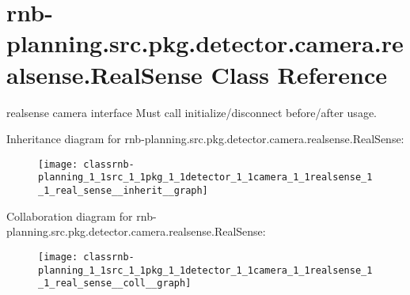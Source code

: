 \hypertarget{classrnb-planning_1_1src_1_1pkg_1_1detector_1_1camera_1_1realsense_1_1_real_sense}{}\section{rnb-\/planning.src.\+pkg.\+detector.\+camera.\+realsense.\+Real\+Sense Class Reference}
\label{classrnb-planning_1_1src_1_1pkg_1_1detector_1_1camera_1_1realsense_1_1_real_sense}


realsense camera interface Must call initialize/disconnect before/after usage.  




Inheritance diagram for rnb-\/planning.src.\+pkg.\+detector.\+camera.\+realsense.\+Real\+Sense\+:
\nopagebreak
\begin{figure}[H]
\begin{center}
\leavevmode
\texttt{[image: classrnb-planning\_1\_1src\_1\_1pkg\_1\_1detector\_1\_1camera\_1\_1realsense\_1\_1\_real\_sense\_\_inherit\_\_graph]}
\end{center}
\end{figure}


Collaboration diagram for rnb-\/planning.src.\+pkg.\+detector.\+camera.\+realsense.\+Real\+Sense\+:
\nopagebreak
\begin{figure}[H]
\begin{center}
\leavevmode
\texttt{[image: classrnb-planning\_1\_1src\_1\_1pkg\_1\_1detector\_1\_1camera\_1\_1realsense\_1\_1\_real\_sense\_\_coll\_\_graph]}
\end{center}
\end{figure}
